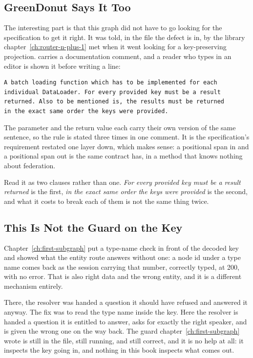 \subsection{GreenDonut Says It Too}

%
The interesting part is that this graph did not have to go looking for the
specification to get it right. It was told, in the file the defect is in, by
the library chapter~\ref{ch:router-n-plus-1} met when it went looking for a
key-preserving projection.  carries a
documentation comment, and a reader who types  in an editor is
shown it before writing a line:

\begin{verbatim}
A batch loading function which has to be implemented for each
individual DataLoader. For every provided key must be a result
returned. Also to be mentioned is, the results must be returned
in the exact same order the keys were provided.
\end{verbatim}

%
The parameter and the return value each carry their own version of the same
sentence, so the rule is stated three times in one comment. It is the
specification's requirement restated one layer down, which makes sense: a
positional span in and a positional span out is the same contract
 has, in a method that knows nothing about federation.

%
Read it as two clauses rather than one. \emph{For every provided key must be a
result returned} is the first, \emph{in the exact same order the keys were
provided} is the second, and what it costs to break each of them is not the
same thing twice.

\subsection{This Is Not the Guard on the Key}

%
Chapter~\ref{ch:first-subgraph} put a type-name check in front of the decoded
key and showed what the entity route answers without one: a 
node id under a  type name comes back as the session carrying
that number, correctly typed, at 200, with no error. That is also right data
and the wrong entity, and it is a different mechanism entirely.

%
There, the resolver was handed a question it should have refused and answered
it anyway. The fix was to read the type name inside the key. Here the resolver
is handed a question it is entitled to answer, asks for exactly the right
speaker, and is given the wrong one on the way back. The guard
chapter~\ref{ch:first-subgraph} wrote is still in the file, still running, and
still correct, and it is no help at all: it inspects the key going in, and
nothing in this book inspects what comes out.
%
